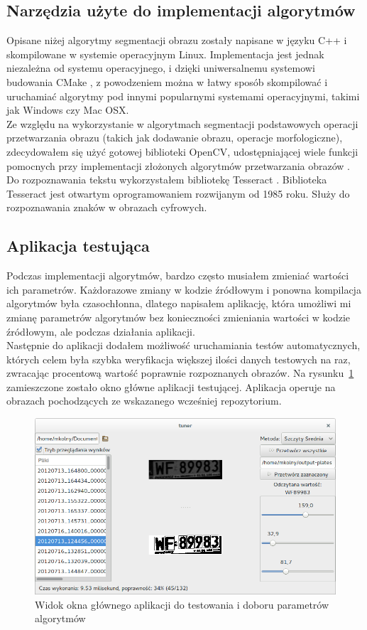 \subsection{Narzędzia użyte do implementacji algorytmów}
Opisane niżej algorytmy segmentacji obrazu zostały napisane w języku C++ i skompilowane w systemie operacyjnym Linux. Implementacja jest jednak niezależna od systemu operacyjnego, i dzięki uniwersalnemu systemowi budowania CMake \cite{cmake}, z powodzeniem można w łatwy sposób skompilować i uruchamiać algorytmy pod innymi popularnymi systemami operacyjnymi, takimi jak Windows czy Mac OSX.\\
Ze względu na wykorzystanie w algorytmach segmentacji podstawowych operacji przetwarzania obrazu (takich jak dodawanie obrazu, operacje morfologiczne), zdecydowałem się użyć gotowej biblioteki OpenCV, udostępniającej wiele funkcji pomocnych przy implementacji złożonych algorytmów przetwarzania obrazów \cite{opencv}\cite{dawsonhowe14}.\\
Do rozpoznawania tekstu wykorzystałem bibliotekę Tesseract \cite{tesseract}. Biblioteka Tesseract jest otwartym oprogramowaniem rozwijanym od 1985 roku. Służy do rozpoznawania znaków w obrazach cyfrowych.
\subsection{Aplikacja testująca}
Podczas implementacji algorytmów, bardzo często musiałem zmieniać wartości ich parametrów. Każdorazowe zmiany w kodzie źródłowym i ponowna kompilacja algorytmów była czasochłonna, dlatego napisałem aplikację, która umożliwi mi zmianę parametrów algorytmów bez konieczności zmieniania wartości w kodzie źródłowym, ale podczas działania aplikacji.\\
Następnie do aplikacji dodałem możliwość uruchamiania testów automatycznych, których celem była szybka weryfikacja większej ilości danych testowych na raz, zwracając procentową wartość poprawnie rozpoznanych obrazów. Na rysunku~\ref{fig:tuner_screenshot} zamieszczone zostało okno główne aplikacji testującej. Aplikacja operuje na obrazach pochodzących ze wskazanego wcześniej repozytorium.

\begin{figure}
  \centering
  \includegraphics[width=1\textwidth]{img/tuner-screenshot}
  \caption{Widok okna głównego aplikacji do testowania i doboru parametrów algorytmów}
  \label{fig:tuner_screenshot}
\end{figure}

